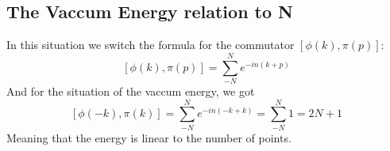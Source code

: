 \documentclass{article}
\begin{document}
\subsection{The Vaccum Energy relation to N}
In this situation we switch the formula for the commutator $\left[\phi(k),\pi(p)\right]$:
\begin{equation}
    \left[\phi(k),\pi(p)\right] = \sum_{-N}^{N} e^{-in(k+p)}
\end{equation}
And for the situation of the vaccum energy, we got
\begin{equation}
    \left[\phi(-k),\pi(k)\right] = \sum_{-N}^{N} e^{-in(-k+k)} = \sum_{-N}^{N} 1 = 2N+1
\end{equation}
Meaning that the energy is linear to the number of points.
\end{document}

